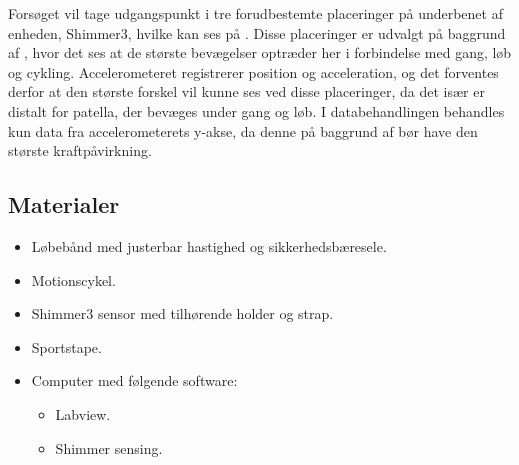 
Forsøget vil tage udgangspunkt i tre forudbestemte placeringer på underbenet af enheden, Shimmer3, hvilke kan ses på . Disse placeringer er udvalgt på baggrund af , hvor det ses at de største bevægelser optræder her i forbindelse med gang, løb og cykling. Accelerometeret registrerer position og acceleration, og det forventes derfor at den største forskel vil kunne ses ved disse placeringer, da det især er distalt for patella, der bevæges under gang og løb. I databehandlingen behandles kun data fra accelerometerets y-akse, da denne på baggrund af  bør have den største kraftpåvirkning.





\subsection{Materialer}
\begin{itemize}
	\item Løbebånd med justerbar hastighed og sikkerhedsbæresele.
	\item Motionscykel.
	\item Shimmer3 sensor med tilhørende holder og strap.
	\item Sportstape.
	\item Computer med følgende software:
	\begin{itemize}
		\item Labview.
		\item Shimmer sensing.
	\end{itemize}
\end{itemize}

